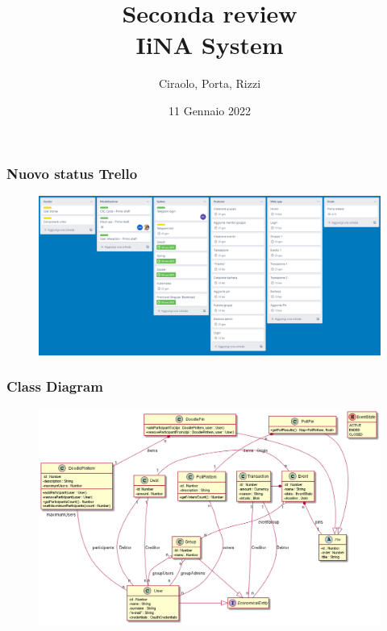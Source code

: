 \documentclass[11pt]{beamer}
\begin{document}
	\author{Ciraolo, Porta, Rizzi}

	\begin{frame}[plain]
		\title[IiNA System]{Seconda review\\IiNA System}
		\date{11 Gennaio 2022}
		\maketitle
	\end{frame}

	\begin{frame}
		\frametitle{Nuovo status Trello}
		\begin{figure}
			\centering
			\includegraphics[width=\linewidth]{trello2}
		\end{figure}
	\end{frame}

	\begin{frame}
		\frametitle{Class Diagram}
		\begin{figure}
			\centering
			\includegraphics[width=\linewidth]{out/class_diagram/Class Diagram}
		\end{figure}
	\end{frame}	
	
\end{document}
